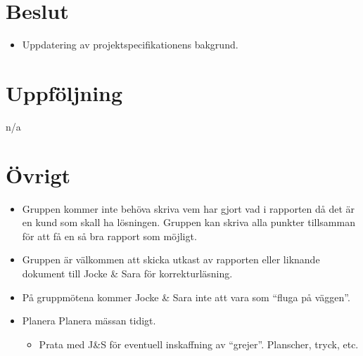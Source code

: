 \section*{Beslut}
\begin{itemize}[noitemsep]
    \item Uppdatering av projektspecifikationens bakgrund.
\end{itemize}

\section*{Uppföljning}
n/a

\section*{Övrigt}
\begin{itemize}[noitemsep]
    \item Gruppen kommer inte behöva skriva vem har gjort vad i rapporten då det är en kund som skall ha lösningen. Gruppen kan skriva alla punkter tillsamman för att få en så bra rapport som möjligt.
    \item Gruppen är välkommen att skicka utkast av rapporten eller liknande dokument till Jocke \& Sara för korrekturläsning.
    \item På gruppmötena kommer Jocke \& Sara inte att vara som \textquotedblleft fluga på väggen\textquotedblright.
    \item Planera Planera mässan tidigt.
    \begin{itemize}[noitemsep]
        \item Prata med J\&S för eventuell inskaffning av \textquotedblleft grejer\textquotedblright. Planscher, tryck, etc.
    \end{itemize}
\end{itemize}